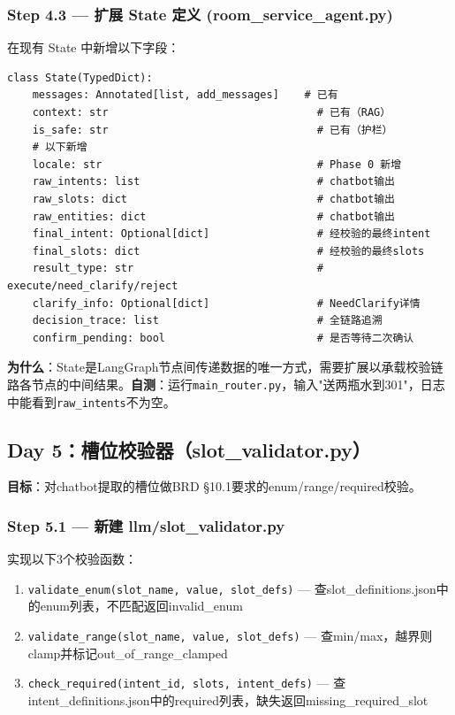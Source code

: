\documentclass[12pt,a4paper]{ctexart}
\begin{document}
\subsubsection*{Step 4.3 — 扩展 State 定义 (room\_service\_agent.py)}

在现有 State 中新增以下字段：

{\small
\begin{verbatim}
class State(TypedDict):
    messages: Annotated[list, add_messages]    # 已有
    context: str                                 # 已有（RAG）
    is_safe: str                                 # 已有（护栏）
    # 以下新增
    locale: str                                  # Phase 0 新增
    raw_intents: list                            # chatbot输出
    raw_slots: dict                              # chatbot输出
    raw_entities: dict                           # chatbot输出
    final_intent: Optional[dict]                 # 经校验的最终intent
    final_slots: dict                            # 经校验的最终slots
    result_type: str                             # execute/need_clarify/reject
    clarify_info: Optional[dict]                 # NeedClarify详情
    decision_trace: list                         # 全链路追溯
    confirm_pending: bool                        # 是否等待二次确认
\end{verbatim}
}

\textbf{为什么}：State是LangGraph节点间传递数据的唯一方式，需要扩展以承载校验链路各节点的中间结果。\textbf{自测}：运行\texttt{main\_router.py}，输入"送两瓶水到301"，日志中能看到\texttt{raw\_intents}不为空。

\newpage

\subsection{Day 5：槽位校验器（slot\_validator.py）}

\textbf{目标}：对chatbot提取的槽位做BRD §10.1要求的enum/range/required校验。

\subsubsection*{Step 5.1 — 新建 llm/slot\_validator.py}

实现以下3个校验函数：

\begin{enumerate}
    \item \texttt{validate\_enum(slot\_name, value, slot\_defs)} — 查slot\_definitions.json中的enum列表，不匹配返回invalid\_enum
    \item \texttt{validate\_range(slot\_name, value, slot\_defs)} — 查min/max，越界则clamp并标记out\_of\_range\_clamped
    \item \texttt{check\_required(intent\_id, slots, intent\_defs)} — 查intent\_definitions.json中的required列表，缺失返回missing\_required\_slot
\end{enumerate}
\end{document}
